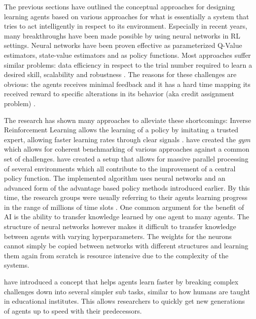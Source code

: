 The previous sections have outlined the conceptual approaches for designing learning agents based on various approaches
for what is essentially a system that tries to act intelligently in respect to its environment. Especially in recent
years, many breakthroughs have been made possible by using neural networks in \ac{RL} settings. Neural networks have
been proven effective as
parameterized Q-Value estimators, state-value estimators and as policy functions. Most approaches suffer similar
problems: data efficiency in respect to the trial number required to learn a desired skill, scalability and robustness
\citep{proximalpolicyopt}. The reasons for these challenges are obvious: the agents receives minimal feedback and it has
a hard time mapping its received reward to specific alterations in its behavior (aka credit assignment problem)
\citep{arulkumaran2017brief}.

The research has shown many approaches to alleviate these shortcomings: Inverse Reinforcement Learning allows the
learning of a policy by imitating a trusted expert, allowing faster learning rates through clear signals
\citep{NG2000InvReinf}. \citet{brockman2016openai} have created the \emph{gym} which allows for coherent benchmarking of
various approaches against a common set of challenges. \citet{hafner2017agents} have created a setup that allows for
massive parallel processing of several environments which all contribute to the improvement of a central policy
function. The implemented algorithm uses neural networks and an advanced form of the advantage based policy methods introduced
earlier. By this time, the research groups were usually referring to their agents learning progress in the range of
millions of time slots \citep{proximalpolicyopt}. One common argument for the benefit of \ac{AI} is the ability to
transfer knowledge learned by one agent to many agents. The structure of neural networks however makes it difficult to transfer
knowledge between agents with varying hyperparameters. The weights for the neurons cannot simply be copied between
networks with different structures and learning them again from scratch is
resource intensive due to the complexity of the systems.

\citet{matiisen2017teacher} have introduced a concept that helps agents learn faster by breaking complex challenges down
into several simpler sub tasks, similar to how humans are taught in educational institutes. This allows researchers to
quickly get new generations of agents up to speed with their predecessors.

